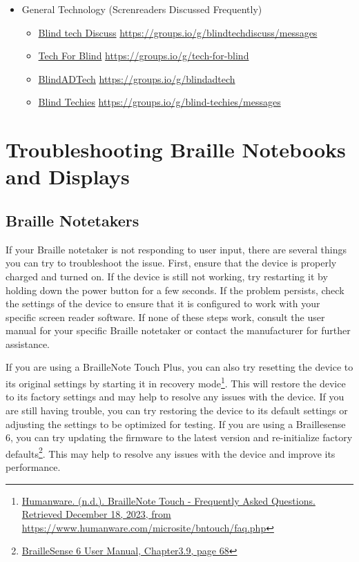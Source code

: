 \documentclass[14pt,letterpaper,twoside]{extreport}
\begin{document}
\begin{appendices}
\begin{itemize}[leftmargin=*]
\item General Technology (Screnreaders Discussed Frequently)
\begin{itemize}[leftmargin=2em]
\item \href{https://groups.io/g/blindtechdiscuss/messages}{Blind tech Discuss}  \break\url{https://groups.io/g/blindtechdiscuss/messages}
\item \href{https://groups.io/g/tech-for-blind}{Tech For Blind}  \break\url{https://groups.io/g/tech-for-blind}
\item \href{https://groups.io/g/blindadtech}{BlindADTech}  \break\url{https://groups.io/g/blindadtech}
\item \href{https://groups.io/g/blind-techies/messages}{Blind Techies}  \break\url{https://groups.io/g/blind-techies/messages}
\end{itemize}
\end{itemize}

\cleardoublepage\hypertarget{trouble2}{}\chapter[\raggedright Troubleshooting Braille Notebooks and Displays\hfill\\]{Troubleshooting Braille Notebooks and Displays}\label{trouble2}
\minitoc \newpage
\hypertarget{notebook2}{}\section{Braille Notetakers}\label{notebook}
If your Braille notetaker is not responding to user input, there are several things you can try to troubleshoot the issue. First, ensure that the device is properly charged and turned on. If the device is still not working, try restarting it by holding down the power button for a few seconds. If the problem persists, check the settings of the device to ensure that it is configured to work with your specific screen reader software. If none of these steps work, consult the user manual for your specific Braille notetaker or contact the manufacturer for further assistance.

If you are using a BrailleNote Touch Plus, you can also try resetting the device to its original settings by starting it in recovery mode\footnote{\href{https://www.humanware.com/microsite/bntouch/faq.ph}{Humanware. (n.d.). BrailleNote Touch - Frequently Asked Questions. Retrieved December 18, 2023, from https://www.humanware.com/microsite/bntouch/faq.php}}. This will restore the device to its factory settings and may help to resolve any issues with the device. If you are still having trouble, you can try restoring the device to its default settings or adjusting the settings to be optimized for testing. If you are using a Braillesense 6, you can try updating the firmware to the latest version and re-initialize factory defaults\footnote{\href{https://hims-inc.com/wp-content/uploads/2023/11/BrailleSense-6-User-Manual-V2-1.pdf}{BrailleSense 6 User Manual, Chapter3.9, page 68}}. This may help to resolve any issues with the device and improve its performance.


\end{appendices}
\end{document}
